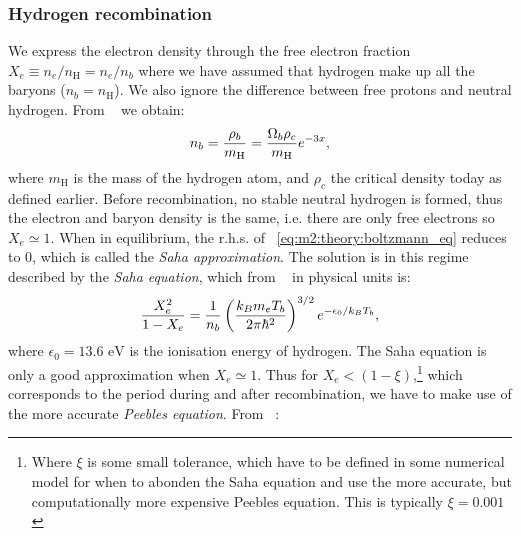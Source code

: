 \subsubsection{Hydrogen recombination}\label{sec:m2:theory:hydrogen_recombination}
    We express the electron density through the free electron fraction $X_e \equiv n_e/n_\mathrm{H} = n_e/n_b$ where we have assumed that hydrogen make up all the baryons ($n_b=n_\mathrm{H}$). We also ignore the difference between free protons and neutral hydrogen. From ~\cite{https://doi.org/10.48550/arxiv.astro-ph/0606683} we obtain:
    \begin{equation}\label{eq:m2:theory:baryon_number_density}
        n_b = \frac{\rho_b}{m_\mathrm{H}} = \frac{\Omega_b\rho_c}{m_\mathrm{H}}e^{-3x},
    \end{equation}
    where $m_\mathrm{H}$ is the mass of the hydrogen atom, and $\rho_c$ the critical density today as defined earlier. Before recombination, no stable neutral hydrogen is formed, thus the electron and baryon density is the same, i.e. there are only free electrons so $X_e \simeq 1$. When in equilibrium, the r.h.s. of ~\cref{eq:m2:theory:boltzmann_eq} reduces to 0, which is called the \textit{Saha approximation}. The solution is in this regime described by the \textit{Saha equation}, which from ~\cite{dodelson2020modern} in physical units is:
    \begin{equation}\label{eq:m2:theory:Saha_equation}
        \frac{X_e^2}{1-X_e} = \frac{1}{n_b}\left(\frac{k_Bm_eT_b}{2\pi\hbar^2}\right)^{3/2}e^{-\epsilon_0/k_BT_b},
    \end{equation}
    where $\epsilon_0 = 13.6\text{ eV}$ is the ionisation energy of hydrogen. The Saha equation is only a good approximation when $X_e \simeq 1$. Thus for $X_e < (1-\xi)$,\footnote{Where $\xi$ is some small tolerance, which have to be defined in some numerical model for when to abonden the Saha equation and use the more accurate, but computationally more expensive Peebles equation. This is typically $\xi=0.001$} which corresponds to the period during and after recombination, we have to make use of the more accurate \textit{Peebles equation}. From ~\cite{https://doi.org/10.48550/arxiv.astro-ph/0606683}:
